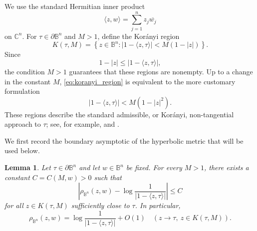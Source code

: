 \documentclass[10pt,a4paper]{amsart}
\numberwithin{equation}{section}
\newtheorem{lemma}[equation]{Lemma}
\begin{document}
We use the standard Hermitian inner product
\begin{equation*}
\langle z,w\rangle
=
\sum_{j=1}^n z_j\overline{w_j}
\end{equation*}
on $\mathbb C^n$. For $\tau\in\partial\mathbb B^n$ and $M>1$, define the
Kor\'anyi region
\begin{equation}
\label{eq:koranyi_region}
K(\tau,M)
=
\left\{
z\in\mathbb B^n:
|1-\langle z,\tau\rangle|
<
M(1-|z|)
\right\}.
\end{equation}
Since
\begin{equation*}
1-|z|
\le
|1-\langle z,\tau\rangle|,
\end{equation*}
the condition $M>1$ guarantees that these regions are nonempty. Up to a
change in the constant $M$, \eqref{eq:koranyi_region} is equivalent to
the more customary formulation
\begin{equation*}
|1-\langle z,\tau\rangle|
<
M(1-|z|^2).
\end{equation*}
These regions describe the standard admissible, or Kor\'anyi,
non-tangential approach to $\tau$; see, for example,
\cite{Ko} and \cite[p.~170]{Rudin}.

We first record the boundary asymptotic of the hyperbolic metric that
will be used below.

\begin{lemma}
\label{lem:ball_asymp}
Let $\tau\in\partial\mathbb B^n$ and let $w\in\mathbb B^n$ be fixed.
For every $M>1$, there exists a constant
$C=C(M,w)>0$ such that
\begin{equation}
\label{eq:ball_asymp}
\left|
\rho_{\mathbb B^n}(z,w)
-
\log\frac{1}{|1-\langle z,\tau\rangle|}
\right|
\le C
\end{equation}
for all $z\in K(\tau,M)$ sufficiently close to $\tau$. In particular,
\begin{equation}
\label{eq:ball_asymp_o1}
\rho_{\mathbb B^n}(z,w)
=
\log\frac{1}{|1-\langle z,\tau\rangle|}
+
O(1)
\quad
(z\to\tau,\ z\in K(\tau,M)).
\end{equation}
\end{lemma}
\end{document}
